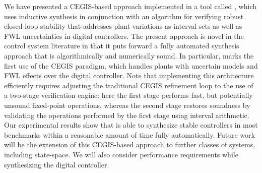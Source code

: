 \documentclass[final]{sig-alternate-05-2015}
\begin{document}
We have presented a CEGIS-based approach implemented in a tool 
called \tool, which uses inductive synthesis in conjunction with 
an algorithm for verifying robust closed-loop stability that addresses 
plant variations as interval sets as well as FWL uncertainties in digital 
controllers. The present approach is novel in the control system 
literature in that it puts forward a fully automated synthesis approach that 
is algorithmically and numerically sound. In particular, \tool marks the first 
use of the CEGIS paradigm, which handles plants with uncertain models and 
FWL effects over the digital controller.  Note that implementing this architecture 
efficiently requires adjusting the traditional CEGIS refinement loop to the use 
of a two-stage verification engine: here the first stage performs fast, but potentially 
unsound fixed-point operations, whereas the second stage restores soundness 
by validating the operations performed by the first stage using interval 
arithmetic. Our experimental results show that \tool
is able to synthesize stable controllers in most benchmarks within
a reasonable amount of time fully automatically.  Future work will be the 
extension of this CEGIS-based approach to further classes of systems, 
including state-space.  We will also consider performance 
requirements while synthesizing the digital controller.


  

\end{document}
